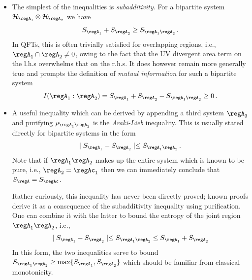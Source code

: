\documentclass[12pt,openany]{book}
\begin{document}
\begin{itemize}
\item The simplest of the inequalities is {\em subadditivity}. For a bipartite system ${\cal H}_{\regA_1} \otimes {\cal H}_{\regA_2}$  we have
%
\begin{equation}
S_{\regA_1} + S_{\regA_2} \geq  S_{\regA_1 \regA_2}  \,.
\label{eq:sa}
\end{equation}
%
In QFTs, this is often trivially satisfied for overlapping regions, i.e., $\regA_1 \cap \regA_2 \neq 0$, owing to the fact that the UV divergent area term on the l.h.s overwhelms that on the r.h.s. It  does however remain more generally true and  prompts the definition of {\em mutual information} for such a bipartite system
%
\begin{equation}
I(\regA_1: \regA_2 ) =S_{\regA_1} + S_{\regA_2} -  S_{\regA_1 \regA_2}  \geq 0 \,.
\label{eq:midef}
\end{equation}
%
\item A useful inequality which can be derived by appending a third system $\regA_3$ and purifying $\rho_{\regA_1 \regA_2}$ is the {\em Araki-Lieb} inequality. This is usually stated directly for bipartite systems in the form
%
\begin{equation}
\mid S_{\regA_1} - S_{\regA_2} \mid \leq S_{\regA_1 \regA_2} \,.
\label{eq:alineq}
\end{equation}
%
Note that if $\regA_1 \regA_2$ makes up the entire system which is known to be pure, i.e., $\regA_2 =  \regAc_1 $ then we can immediately conclude that $S_\regA = S_{\regAc}$.

Rather curiously, this inequality has never been directly proved; known proofs derive it as a consequence of the subadditivity inequality using purification. One can combine it with the latter to bound the entropy of the joint region $\regA_1 \regA_2$, i.e.,
%
\begin{equation}
\mid S_{\regA_1} - S_{\regA_2} \mid \leq S_{\regA_1 \regA_2} \leq S_{\regA_1} + S_{\regA_2}
\label{eq:classical}
\end{equation}
%
In this form, the two inequalities serve to bound $S_{\regA_1 \regA_2} \geq \text{max}\{S_{\regA_1}, S_{\regA_2} \}$ which should be familiar from classical monotonicity.


\end{itemize}
\end{document}
